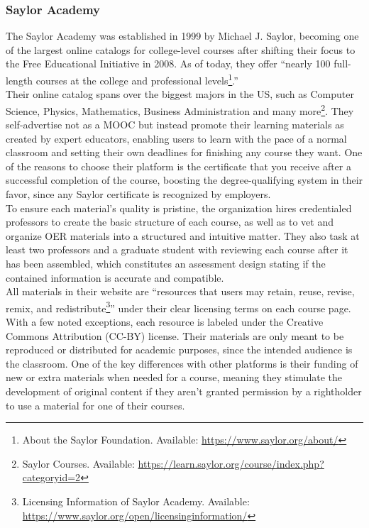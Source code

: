 \documentclass[a4paper]{article}
\begin{document}
\subsubsection{Saylor Academy}

The Saylor Academy was established in 1999 by Michael J. Saylor, becoming one of the largest online catalogs for college-level courses after shifting their focus to the Free Educational Initiative in 2008. As of today, they offer ``nearly 100 full-length courses at the college and professional levels\footnote{About the Saylor Foundation. Available: \url{https://www.saylor.org/about/}}.'' \\

\noindent
Their online catalog spans over the biggest majors in the US, such as Computer Science, Physics, Mathematics, Business Administration and many more\footnote{Saylor Courses. Available: \url{https://learn.saylor.org/course/index.php?categoryid=2}}. They self-advertise not as a MOOC but instead promote their learning materials as created by expert educators, enabling users to learn with the pace of a normal classroom and setting their own deadlines for finishing any course they want. One of the reasons to choose their platform is the certificate that you receive after a successful completion of the course, boosting the degree-qualifying system in their favor, since any Saylor certificate is recognized by employers. \\

\noindent
To ensure each material's quality is pristine, the organization hires credentialed professors to create the basic structure of each course, as well as to vet and organize OER materials into a structured and intuitive matter. They also task at least two professors and a graduate student with reviewing each course after it has been assembled, which constitutes an assessment design stating if the contained information is accurate and compatible. \\

\noindent
All materials in their website are ``resources that users may retain, reuse, revise, remix, and redistribute\footnote{Licensing Information of Saylor Academy. Available: \url{https://www.saylor.org/open/licensinginformation/}}'' under their clear licensing terms on each course page. With a few noted exceptions, each resource is labeled under the Creative Commons Attribution (CC-BY) license. Their materials are only meant to be reproduced or distributed for academic purposes, since the intended audience is the classroom. One of the key differences with other platforms is their funding of new or extra materials when needed for a course, meaning they stimulate the development of original content if they aren't granted permission by a rightholder to use a material for one of their courses. 
\end{document}
